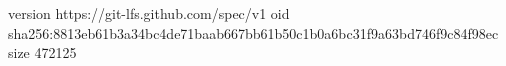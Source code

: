version https://git-lfs.github.com/spec/v1
oid sha256:8813eb61b3a34bc4de71baab667bb61b50c1b0a6bc31f9a63bd746f9c84f98ec
size 472125
